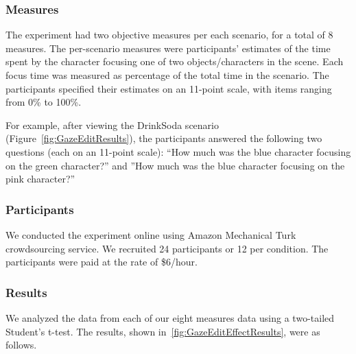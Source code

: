 \subsubsection{Measures}

The experiment had two objective measures per each scenario, for a total of 8 measures. The per-scenario measures were participants' estimates of the time spent by the character focusing one of two objects/characters in the scene. Each focus time was measured as percentage of the total time in the scenario. The participants specified their estimates on an 11-point scale, with items ranging from 0\% to 100\%.

For example, after viewing the DrinkSoda scenario (Figure~\ref{fig:GazeEditResults}), the participants answered the following two questions (each on an 11-point scale): ``How much was the blue character focusing on the green character?'' and ''How much was the blue character focusing on the pink character?''

\subsubsection{Participants}

We conducted the experiment online using Amazon Mechanical Turk crowdsourcing service. We recruited 24 participants or 12 per condition. The participants were paid at the rate of \$6/hour.

\subsubsection{Results}

We analyzed the data from each of our eight measures data using a two-tailed Student's t-test. The results, shown in~\ref{fig:GazeEditEffectResults}, were as follows.

